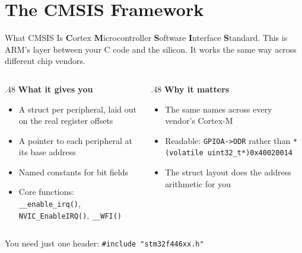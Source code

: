 \documentclass[9pt,aspectratio=169,xcolor=table]{beamer}
\begin{document}
\section{The CMSIS Framework}

\begin{frame}{What CMSIS Is}
    \leavevmode
    {\small \textbf{C}ortex \textbf{M}icrocontroller \textbf{S}oftware
    \textbf{I}nterface \textbf{S}tandard. This is ARM's layer between
    your C code and the silicon. It works the same way across
    different chip vendors.}

    \vspace{3mm}
    \begin{columns}[T]
    \begin{column}{.48\textwidth}
        \textbf{What it gives you}
        {\small
        \begin{itemize}\itemsep1pt
            \item A \alert{struct} per peripheral, laid out on the real register
                  offsets
            \item A \alert{pointer} to each peripheral at its base address
            \item Named constants for bit fields
            \item Core functions: \texttt{\_\_enable\_irq()},
                  \texttt{NVIC\_EnableIRQ()}, \texttt{\_\_WFI()}
        \end{itemize}}
    \end{column}
    \begin{column}{.48\textwidth}
        \textbf{Why it matters}
        {\small
        \begin{itemize}\itemsep1pt
            \item The \alert{same names} across every vendor's Cortex-M
            \item Readable: \texttt{GPIOA->ODR} rather than
                  \texttt{*(volatile uint32\_t*)0x40020014}
            \item The struct layout does the address arithmetic for you
        \end{itemize}}
    \end{column}
    \end{columns}

    \vspace{2mm}
    {\small You need just one header: \texttt{\#include "stm32f446xx.h"}}
\end{frame}
\end{document}
